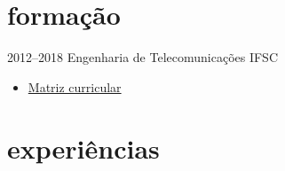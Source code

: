\documentclass[]{friggeri-cv} %
\begin{document}

\section{formação}

\begin{entrylist}
\entry
{2012--2018}
{Engenharia de Telecomunicações}
{IFSC}
{
    \begin{itemize}
        \item \href{https://www.sj.ifsc.edu.br/index.php/campus/boletins-informativos/198-engenharia-de-telecomunicacoes-m
atriz-curricular}{Matriz curricular}
    \end{itemize}
}
\end{entrylist}


\section{experiências}
\end{document}
